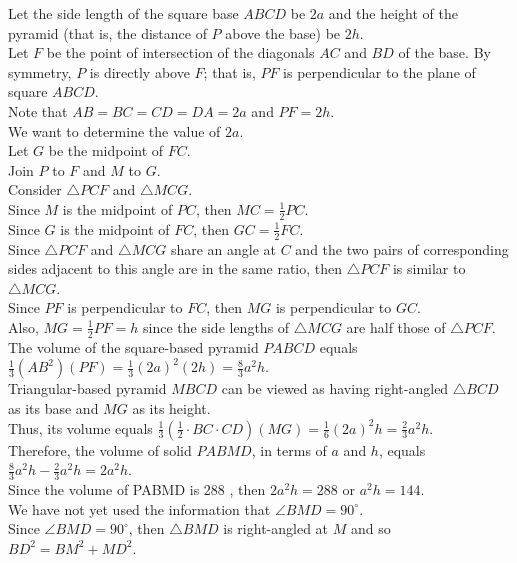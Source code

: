 \documentclass{article}
\begin{document}
 Let the side length of the square base $A B C D$ be $2 a$ and the height of the pyramid (that is, the distance of $P$ above the base) be $2 h$.\\
Let $F$ be the point of intersection of the diagonals $A C$ and $B D$ of the base. By symmetry, $P$ is directly above $F$; that is, $P F$ is perpendicular to the plane of square $A B C D$.\\
Note that $A B=B C=C D=D A=2 a$ and $P F=2 h$. \\
We want to determine the value of $2 a$.\\
Let $G$ be the midpoint of $F C$.\\
Join $P$ to $F$ and $M$ to $G$.\\
Consider $\triangle P C F$ and $\triangle M C G$.\\
Since $M$ is the midpoint of $P C$, then $M C=\frac{1}{2} P C$.\\
Since $G$ is the midpoint of $F C$, then $G C=\frac{1}{2} F C$.\\
Since $\triangle P C F$ and $\triangle M C G$ share an angle at $C$ and the two pairs of corresponding sides adjacent to this angle are in the same ratio, then $\triangle P C F$ is similar to $\triangle M C G$.\\
Since $P F$ is perpendicular to $F C$, then $M G$ is perpendicular to $G C$.\\
Also, $M G=\frac{1}{2} P F=h$ since the side lengths of $\triangle M C G$ are half those of $\triangle P C F$.\\
The volume of the square-based pyramid $P A B C D$ equals $\frac{1}{3}\left(A B^2\right)(P F)=\frac{1}{3}(2 a)^2(2 h)=\frac{8}{3} a^2 h$.\\
Triangular-based pyramid $M B C D$ can be viewed as having right-angled $\triangle B C D$ as its base and $M G$ as its height.\\
Thus, its volume equals $\frac{1}{3}\left(\frac{1}{2} \cdot B C \cdot C D\right)(M G)=\frac{1}{6}(2 a)^2 h=\frac{2}{3} a^2 h$.\\
Therefore, the volume of solid $P A B M D$, in terms of $a$ and $h$, equals $\frac{8}{3} a^2 h-\frac{2}{3} a^2 h=2 a^2 h$.\\
Since the volume of PABMD is 288 , then $2 a^2 h=288$ or $a^2 h=144$.\\
We have not yet used the information that $\angle B M D=90^{\circ}$.\\
Since $\angle B M D=90^{\circ}$, then $\triangle B M D$ is right-angled at $M$ and so $B D^2=B M^2+M D^2$.\\
\end{document}
